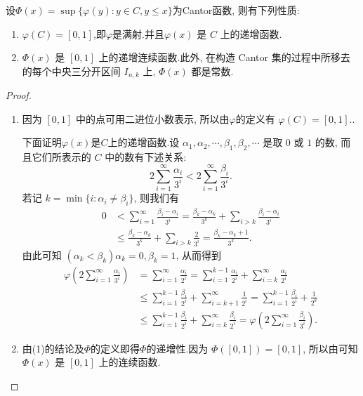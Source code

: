 \documentclass[../../main.tex]{subfiles}%
\begin{document}
\begin{theorem}[Cantor函数的性质]\label{theorem:Cantor函数的性质}
设$\varPhi(x)=\sup\{\varphi(y):y\in C,y\leqslant x\}$为Cantor函数, 则有下列性质:
\begin{enumerate}[(1)]
\item \(\varphi(C)=[0,1]\),即$\varphi$是满射.并且\(\varphi(x)\) 是 \(C\) 上的递增函数.

\item \(\varPhi(x)\) 是 \([0,1]\) 上的递增连续函数.此外, 在构造 Cantor 集的过程中所移去的每个中央三分开区间 \(I_{n,k}\) 上, \(\varPhi(x)\) 都是常数. 
\end{enumerate}
\end{theorem}
\begin{proof}
\begin{enumerate}[(1)]
\item 因为 \([0,1]\) 中的点可用二进位小数表示, 所以由$\varphi$的定义有 \(\varphi(C)=[0,1]\)..

下面证明$\varphi(x)$是$C$上的递增函数.设 \(\alpha_1,\alpha_2,\cdots,\beta_1,\beta_2,\cdots\) 是取 \(0\) 或 \(1\) 的数, 而且它们所表示的 \(C\) 中的数有下述关系:
\[
2\sum_{i = 1}^{\infty}\frac{\alpha_i}{3^i}<2\sum_{i = 1}^{\infty}\frac{\beta_i}{3^i}.
\]
若记 \(k = \min\{i:\alpha_i\neq\beta_i\}\), 则我们有
\begin{align*}
0&<\sum_{i = 1}^{\infty}\frac{\beta_i - \alpha_i}{3^i}=\frac{\beta_k - \alpha_k}{3^k}+\sum_{i > k}\frac{\beta_i - \alpha_i}{3^i}\\
&\leqslant\frac{\beta_k - \alpha_k}{3^k}+\sum_{i > k}\frac{2}{3^i}=\frac{\beta_k - \alpha_k + 1}{3^k}.
\end{align*}
由此可知 \((\alpha_k<\beta_k)\alpha_k = 0,\beta_k = 1\), 从而得到
\begin{align*}
\varphi\left(2\sum_{i = 1}^{\infty}\frac{\alpha_i}{3^i}\right)&=\sum_{i = 1}^{\infty}\frac{\alpha_i}{2^i}=\sum_{i = 1}^{k - 1}\frac{\alpha_i}{2^i}+\sum_{i = k}^{\infty}\frac{\alpha_i}{2^i}\\
&\leqslant\sum_{i = 1}^{k - 1}\frac{\beta_i}{2^i}+\sum_{i = k + 1}^{\infty}\frac{1}{2^i}=\sum_{i = 1}^{k - 1}\frac{\beta_i}{2^i}+\frac{1}{2^k}\\
&\leqslant\sum_{i = 1}^{k - 1}\frac{\beta_i}{2^i}+\sum_{i = k}^{\infty}\frac{\beta_i}{2^i}=\varphi\left(2\sum_{i = 1}^{\infty}\frac{\beta_i}{3^i}\right).
\end{align*}

\item 由(1)的结论及$\varPhi$的定义即得$\varPhi$的递增性.因为 \(\varPhi([0,1]) = [0,1]\), 所以由可知\(\varPhi(x)\) 是 \([0,1]\) 上的连续函数. 
\end{enumerate}
\end{proof}
\end{document}
